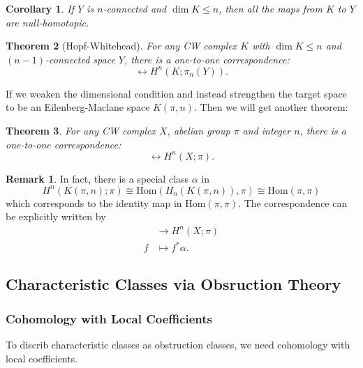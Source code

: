 \documentclass[12pt,a4paper]{article}
\newtheorem{theorem}{\indent Theorem}%
\newtheorem{corollary}[theorem]{\indent Corollary}
\theoremstyle{definition}
\newtheorem*{remark}{\noindent Remark}
\newcommand{\Aut}{{\rm Aut}}
\newcommand{\Hom}{\mathrm{Hom}}
\begin{document}
\begin{corollary}
    If $Y$ is $n$-connected and $\dim K\leq n$, then all the maps from $K$ 
    to $Y$ are null-homotopic.
\end{corollary}

\begin{theorem}[Hopf-Whitehead]
    For any CW complex $K$ with $\dim K\leq n$ and $(n-1)$-connected space $Y$, 
    there is a one-to-one correspondence:
    \begin{equation*}
        [K,Y]\longleftrightarrow H^n(K;\pi_n(Y)).
    \end{equation*}
\end{theorem}
If we weaken the dimensional condition and instead strengthen the target space 
to be an Eilenberg-Maclane space $K(\pi,n)$. Then we will get another theorem: 
\begin{theorem}
    For any CW complex $X$, abelian group $\pi$ and integer $n$, there is a 
    one-to-one correspondence: 
    \begin{equation*}
        [X,K(\pi,n)]\longleftrightarrow H^n(X;\pi).
    \end{equation*}
\end{theorem}
\begin{remark}
    In fact, there is a special class $\alpha$ in 
    \begin{equation*}
        H^n(K(\pi,n);\pi)\cong \Hom(H_n(K(\pi,n)),\pi)\cong \Hom(\pi,\pi)
    \end{equation*}
    which corresponds to the identity map in $\Hom(\pi,\pi)$. The correspondence 
    can be explicitly written by 
    \begin{align*}
        [X,K(\pi,n)]&\to H^n(X;\pi) \\
        f&\mapsto f^*\alpha.
    \end{align*}
\end{remark}

\subsection*{Characteristic Classes via Obsruction Theory}
\subsubsection*{Cohomology with Local Coefficients}
To discrib characteristic classes as obstruction classes, we need cohomology 
with local coefficients. 
\end{document}
